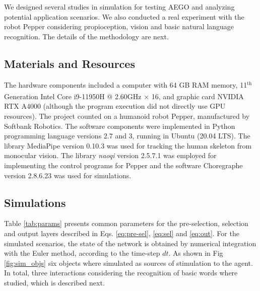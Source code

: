 \documentclass[letterpaper, 10 pt, conference]{ieeeconf}  %
\begin{document}
	We designed several studies in simulation for testing AEGO and analyzing potential application scenarios. We also conducted a real experiment with the robot Pepper considering propioception, vision and basic natural language recognition. The details of the methodology are next.

	\subsection{Materials and Resources}
	
	The hardware components included a computer with 64 GB RAM memory, 11${}^\mathrm{th}$ Generation Intel\textsuperscript{\textregistered} Core\textsuperscript{\texttrademark} i9-11950H @ 2.60GHz × 16, and graphic card NVIDIA RTX A4000 (although the program execution did not directly use GPU resources). The project counted on a humanoid robot Pepper, manufactured by Softbank Robotics. The software components were implemented in Python programming language versions 2.7 and 3, running in Ubuntu (20.04 LTS). The library MediaPipe version 0.10.3 was used for tracking the human skeleton from monocular vision. The library \textit{naoqi} version 2.5.7.1 was employed for implementing the control programs  for Pepper and the software Choregraphe version 2.8.6.23 was used for simulations. 
	
	\subsection{Simulations}
	
	Table \ref{tab:params} presents common parameters for the pre-selection, selection and output layers described in Eqs. \eqref{eq:pre-sel}, \eqref{eq:sel} and \eqref{eq:out}. For the simulated scenarios, the state of the network is obtained by numerical integration with the Euler method, according to the time-step $dt$. As shown in Fig \ref{fig:sim_objs} six objects where simulated as sources of stimulation to the agent. In total, three interactions considering the recognition of basic words where studied, which is described next. 
	
	\renewcommand{\arraystretch}{1.2} %
	
\end{document}
